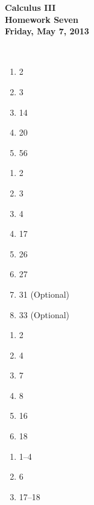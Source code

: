 \documentclass[12pt]{article}
\begin{document}
\pagestyle{empty}
 
\begin{center}
{\large {\bf Calculus III}}\\
\medskip
{\large {\bf Homework Seven}}\\
\medskip
{ {\bf Friday, May 7, 2013}}\\
\end{center}

\hspace{2mm}\\


\begin{enumerate}
\setlength{\itemsep}{-1mm}
  \item 2
  \item 3
  \item 14
  \item 20
  \item 56
\end{enumerate}

\begin{enumerate}
\setlength{\itemsep}{-1mm}
  \item 2
  \item 3
  \item 4
  \item 17
  \item 26
  \item 27
  \item 31 (Optional)
  \item 33 (Optional)
\end{enumerate}

\begin{enumerate}
\setlength{\itemsep}{-1mm}
  \item 2
  \item 4
  \item 7
  \item 8
  \item 16
  \item 18
\end{enumerate}


\begin{enumerate}
\setlength{\itemsep}{-1mm}
  \item 1--4
  \item 6
  \item 17--18
\end{enumerate}
\end{document}
